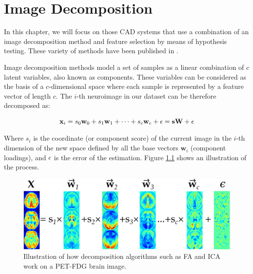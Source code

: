 \chapter{Image Decomposition}\label{ch:decomposition}

In this chapter, we will focus on those \ac{CAD} systems that use a combination of an image decomposition method and feature selection by means of hypothesis testing. These variety of methods have been published in \cite{Martinez201141,Martinez-Murcia20129676,Martinez-Murcia2013255,Martinez-Murcia201458}. 

Image decomposition methods model a set of samples as a linear combination of $c$ latent variables, also known as components. These variables can be considered as the basis of a $c$-dimensional space where each sample is represented by a feature vector of length $c$. The $i$-th neuroimage in our dataset can be therefore decomposed as: 

\begin{equation}\label{eq:generalDecomposition}
\mathbf{x}_i = s_0 \mathbf{w}_0 + s_1 \mathbf{w}_1 + \dots + s_c \mathbf{w}_c + \boldmath\epsilon = \mathbf{s}\mathbf{W} + \boldmath\epsilon
\end{equation}

Where $s_i$ is the coordinate (or component score) of the current image in the $i$-th dimension of the new space defined by all the base vectors $\mathbf{w}_i$ (component loadings), and $\boldmath\epsilon$ is the error of the estimation. Figure \ref{fig:decomposition_overview} shows an illustration of the process. 

\begin{figure}[tph]
	\centering
	\includegraphics[width=0.9\linewidth]{Graphics/ch4/decomposition_overview}
	\caption[Illustration of how decomposition algorithms work.]{Illustration of how decomposition algorithms such as \ac{FA} and \ac{ICA} work on a \ac{PET}-FDG brain image.}
	\label{fig:decomposition_overview}
\end{figure}


